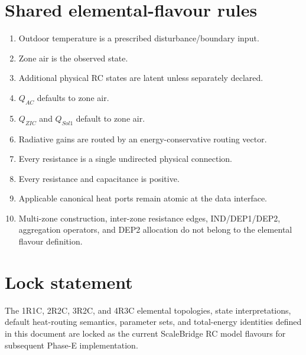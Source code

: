 \documentclass[11pt]{article}
\begin{document}
\section{Shared elemental-flavour rules}
\begin{enumerate}
\item Outdoor temperature is a prescribed disturbance/boundary input.
\item Zone air is the observed state.
\item Additional physical RC states are latent unless separately declared.
\item $Q_{AC}$ defaults to zone air.
\item $Q_{ZIC}$ and $Q_{Sol1}$ default to zone air.
\item Radiative gains are routed by an energy-conservative routing vector.
\item Every resistance is a single undirected physical connection.
\item Every resistance and capacitance is positive.
\item Applicable canonical heat ports remain atomic at the data interface.
\item Multi-zone construction, inter-zone resistance edges, IND/DEP1/DEP2, aggregation operators, and DEP2 allocation do not belong to the elemental flavour definition.
\end{enumerate}

\section*{Lock statement}
The 1R1C, 2R2C, 3R2C, and 4R3C elemental topologies, state interpretations, default heat-routing semantics, parameter sets, and total-energy identities defined in this document are locked as the current ScaleBridge RC model flavours for subsequent Phase-E implementation.
\end{document}
